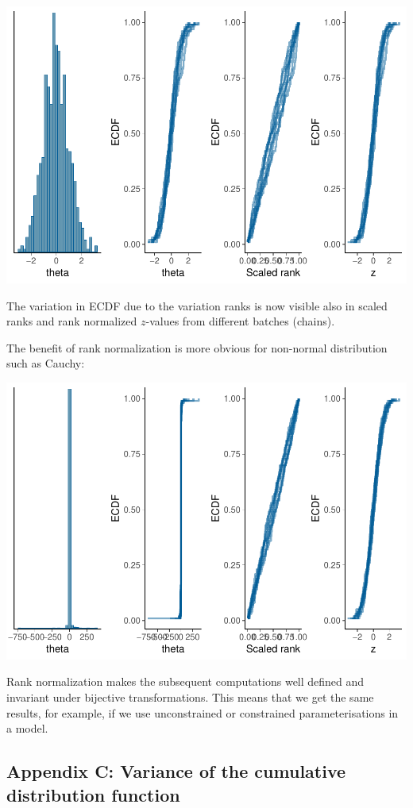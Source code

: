 \documentclass[american,]{article}
\begin{document}
\includegraphics{graphics/ranknorm-normal2-1.pdf}

The variation in ECDF due to the variation ranks is now visible also in
scaled ranks and rank normalized \(z\)-values from different batches
(chains).

The benefit of rank normalization is more obvious for non-normal
distribution such as Cauchy:

\includegraphics{graphics/ranknorm-cauchy2-1.pdf}

Rank normalization makes the subsequent computations well defined and
invariant under bijective transformations. This means that we get the
same results, for example, if we use unconstrained or constrained
parameterisations in a model.

\hypertarget{AppendixC}{%
\subsection*{Appendix C: Variance of the cumulative distribution
function}\label{AppendixC}}
\end{document}
